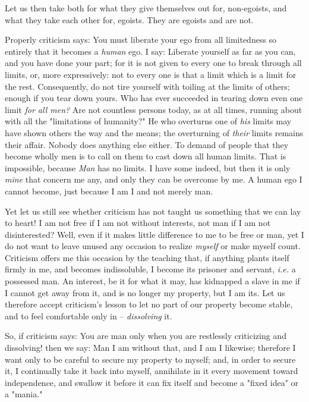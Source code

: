 Let us then take both for what they give themselves out for, non-egoists, and 
what they take each other for, egoists. They are egoists and are not.

Properly criticism says: You must liberate your ego from all limitedness so 
entirely that it becomes a \textit{human} ego. I say: Liberate yourself as far 
as you can, and you have done your part; for it is not given to every one to 
break through all limits, or, more expressively: not to every one is that a 
limit which is a limit for the rest. Consequently, do not tire yourself with 
toiling at the limits of others; enough if you tear down yours. Who has ever 
succeeded in tearing down even one limit \textit{for all men?} Are not 
countless persons today, as at all times, running about with all the 
"{}limitations of humanity?"{} He who overturns one of \textit{his} limits may 
have shown others the way and the means; the overturning of \textit{their} 
limits remains their affair. Nobody does anything else either. To demand of 
people that they become wholly men is to call on them to cast down all human 
limits. That is impossible, because \textit{Man} has no limits. I have some 
indeed, but then it is only \textit{mine} that concern me any, and only they 
can be overcome by me. A human ego I cannot become, just because I am I and 
not merely man.

Yet let us still see whether criticism has not taught us something that we can 
lay to heart! I am not free if I am not without interests, not man if I am not 
disinterested? Well, even if it makes little difference to me to be free or 
man, yet I do not want to leave unused any occasion to realize \textit{myself} 
or make myself count. Criticism offers me this occasion by the teaching that, 
if anything plants itself firmly in me, and becomes indissoluble, I become its 
prisoner and servant, \textit{i.e.} a possessed man. An interest, be it for 
what it may, has kidnapped a slave in me if I cannot get away from it, and is 
no longer my property, but I am its. Let us therefore accept criticism's 
lesson to let no part of our property become stable, and to feel comfortable 
only in -- \textit{dissolving} it.

So, if criticism says: You are man only when you are restlessly criticizing 
and dissolving! then we say: Man I am without that, and I am I likewise; 
therefore I want only to be careful to secure my property to myself; and, in 
order to secure it, I continually take it back into myself, annihilate in it 
every movement toward independence, and swallow it before it can fix itself 
and become a "{}fixed idea"{} or a "{}mania."{}

